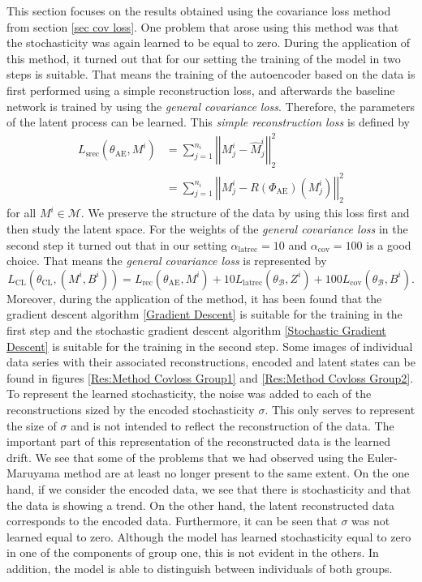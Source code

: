 \documentclass[11pt,titlepage]{article}
\newcommand{\abs}[1]{{\left| #1 \right|}}
\theoremstyle{definition}
\theoremstyle{remark}
\begin{document}
	This section focuses on the results obtained using the covariance loss method from section \ref{sec cov loss}. One problem that arose using this method was that the stochasticity was again learned to be equal to zero. During the application of this method, it turned out that for our setting the training of the model in two steps is suitable. That means the training of the autoencoder based on the data is first performed using a simple reconstruction loss, and afterwards the baseline network is trained by using the \textsl{general covariance loss}. Therefore, the parameters of the latent process can be learned. This \textsl{simple reconstruction loss} is defined by
	\begin{align*}
		L_\mathrm{srec}(\theta_{\mathrm{AE}}, M^i)&=\sum_{j=1}^{n_i}\abs{\abs{M^i_j - \hat{M}^i_j}}_2^2\\
		&= \sum_{j=1}^{n_i}\abs{\abs{M^i_j - R(\Phi_{\mathrm{AE}})(M^i_j)}}_2^2
	\end{align*}
	for all $M^i\in\mathcal{M}$. We preserve the structure of the data by using this loss first and then study the latent space. For the weights of the \textsl{general covariance loss} in the second step it turned out that in our setting $\alpha_\mathrm{latrec}=10$ and $\alpha_\mathrm{cov}=100$ is a good choice. That means the \textsl{general covariance loss} is represented by
	\[L_\mathrm{CL}(\theta_\mathrm{CL}, (M^i, B^i)) = L_\mathrm{rec}(\theta_{\mathrm{AE}}, M^i) + 10 L_\mathrm{latrec}(\theta_\mathcal{B}, Z^i) + 100L_\mathrm{cov}(\theta_\mathcal{B}, B^i).\]
	Moreover, during the application of the method, it has been found that the gradient descent algorithm \ref{Gradient Descent} is suitable for the training in the first step and the stochastic gradient descent algorithm \ref{Stochastic Gradient Descent} is suitable for the training in the second step. 
	Some images of individual data series with their associated reconstructions, encoded and latent states can be found in figures \ref{Res:Method Covloss Group1} and \ref{Res:Method Covloss Group2}. 
	To represent the learned stochasticity, the noise was added to each of the reconstructions sized by the encoded stochasticity $\sigma$. This only serves to represent the size of $\sigma$ and is not intended to reflect the reconstruction of the data. The important part of this representation of the reconstructed data is the learned drift. 
	We see that some of the problems that we had observed using the Euler-Maruyama method are at least no longer present to the same extent. On the one hand, if we consider the encoded data, we see that there is stochasticity and that the data is showing a trend. On the other hand, the latent reconstructed data corresponds to the encoded data. Furthermore, it can be seen that $\sigma$ was not learned equal to zero. Although the model has learned stochasticity equal to zero in one of the components of group one, this is not evident in the others. In addition, the model is able to distinguish between individuals of both groups.
	
\end{document}
